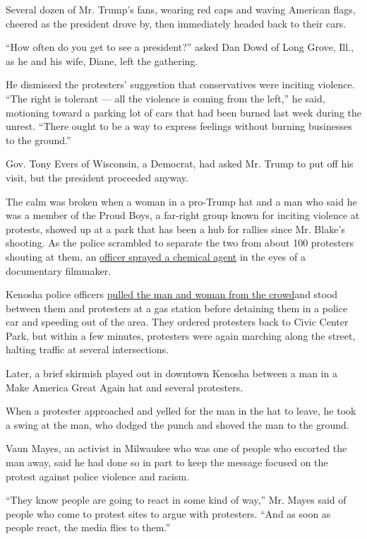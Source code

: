 Several dozen of Mr. Trump's fans, wearing red caps and waving American
flags, cheered as the president drove by, then immediately headed back
to their cars.

``How often do you get to see a president?'' asked Dan Dowd of Long
Grove, Ill., as he and his wife, Diane, left the gathering.

He dismissed the protesters' suggestion that conservatives were inciting
violence. ``The right is tolerant --- all the violence is coming from
the left,'' he said, motioning toward a parking lot of cars that had
been burned last week during the unrest. ``There ought to be a way to
express feelings without burning businesses to the ground.''

Gov. Tony Evers of Wisconsin, a Democrat, had asked Mr. Trump to put off
his visit, but the president proceeded anyway.

The calm was broken when a woman in a pro-Trump hat and a man who said
he was a member of the Proud Boys, a far-right group known for inciting
violence at protests, showed up at a park that has been a hub for
rallies since Mr. Blake's shooting. As the police scrambled to separate
the two from about 100 protesters shouting at them, an
\href{https://twitter.com/nickatnews/status/1300911702373019650?s=21}{officer
sprayed a chemical agent} in the eyes of a documentary filmmaker.

Kenosha police officers
\href{https://twitter.com/NickAtNews/status/1300910722344456194}{pulled
the man and woman from the crowd}and stood between them and protesters
at a gas station before detaining them in a police car and speeding out
of the area. They ordered protesters back to Civic Center Park, but
within a few minutes, protesters were again marching along the street,
halting traffic at several intersections.

Later, a brief skirmish played out in downtown Kenosha between a man in
a Make America Great Again hat and several protesters.

When a protester approached and yelled for the man in the hat to leave,
he took a swing at the man, who dodged the punch and shoved the man to
the ground.

Vaun Mayes, an activist in Milwaukee who was one of people who escorted
the man away, said he had done so in part to keep the message focused on
the protest against police violence and racism.

``They know people are going to react in some kind of way,'' Mr. Mayes
said of people who come to protest sites to argue with protesters. ``And
as soon as people react, the media flies to them.''

